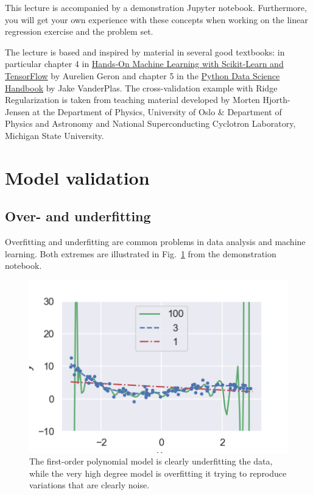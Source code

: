 \documentclass[%
oneside,                 %
final,                   %
10pt]{article}
\begin{document}
\noindent
This lecture is accompanied by a demonstration Jupyter notebook. Furthermore, you will get your own experience with these concepts when working on the linear regression exercise and the problem set.

The lecture is based and inspired by material in several good textbooks: in particular chapter 4 in \href{{http://shop.oreilly.com/product/0636920052289.do}}{Hands‑On Machine Learning with Scikit‑Learn and TensorFlow} by Aurelien Geron and chapter 5 in the 
\href{{http://shop.oreilly.com/product/0636920034919.do}}{Python Data Science Handbook} by Jake VanderPlas.
The cross-validation example with Ridge Regularization is taken from teaching material developed by Morten Hjorth-Jensen at the Department of Physics, University of Oslo {\&} Department of Physics and Astronomy and National Superconducting Cyclotron Laboratory, Michigan State University. 

\section{Model validation}

\subsection{Over- and underfitting}

Overfitting and underfitting are common problems in data analysis and machine learning. Both extremes are illustrated in Fig.~\ref{fig-over_under_fitting} from the demonstration notebook.


\begin{figure}[!ht]  %
  \centerline{\includegraphics[width=0.8\linewidth]{fig/over_under_fitting.png}}
  \caption{
  The first-order polynomial model is clearly underfitting the data, while the very high degree model is overfitting it trying to reproduce variations that are clearly noise. \label{fig-over_under_fitting}
  }
\end{figure}
\end{document}
